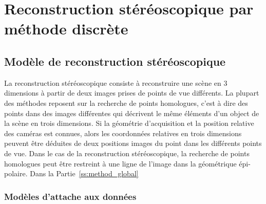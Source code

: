 \documentclass[../main/These_Mathias_Paget.tex]{subfiles}
\begin{document}



\chapter{Reconstruction stéréoscopique par méthode discrète}

\section{Modèle de reconstruction stéréoscopique}

La reconstruction stéréoscopique consiste à reconstruire une scène en 3 dimensions à partir de deux images prises de points de vue différents. La plupart des méthodes reposent sur la recherche de points homologues, c'est à dire des points dans des images différentes qui décrivent le même éléments d'un object de la scène en trois dimensions. Si la géométrie d'acquisition et la position relative des caméras est connues, alors les coordonnées relatives en trois dimensions peuvent être déduites de deux positions images du point dans les différents points de vue. Dans le cas de la reconstruction stéréoscopique, la recherche de points homologues peut être restreint à une ligne de l'image dans la géométrique épi-polaire. Dans la Partie~\ref{ss:method_global}

\subsection{Modèles d'attache aux données}
\end{document}

